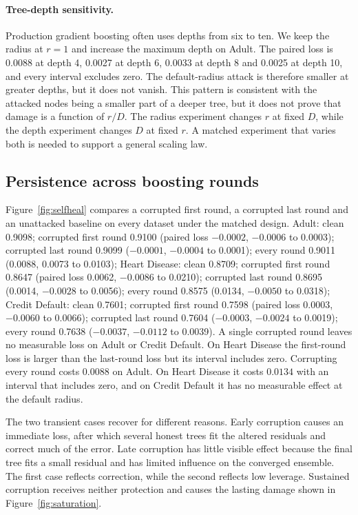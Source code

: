 \documentclass[11pt]{article}
\begin{document}
\paragraph{Tree-depth sensitivity.} Production gradient boosting often uses depths from six to ten. We keep the radius at $r=1$ and increase the maximum depth on Adult. The paired loss is 0.0088 at depth 4, 0.0027 at depth 6, 0.0033 at depth 8 and 0.0025 at depth 10, and every interval excludes zero. The default-radius attack is therefore smaller at greater depths, but it does not vanish. This pattern is consistent with the attacked nodes being a smaller part of a deeper tree, but it does not prove that damage is a function of $r/D$. The radius experiment changes $r$ at fixed $D$, while the depth experiment changes $D$ at fixed $r$. A matched experiment that varies both is needed to support a general scaling law.

\FloatBarrier

\subsection{Persistence across boosting rounds}
\label{sec:persistenceresults}

Figure~\ref{fig:selfheal} compares a corrupted first round, a corrupted last round and an unattacked baseline on every dataset under the matched design. Adult: clean 0.9098; corrupted first round 0.9100 (paired loss $-0.0002$, $-0.0006$ to 0.0003); corrupted last round 0.9099 ($-0.0001$, $-0.0004$ to 0.0001); every round 0.9011 (0.0088, 0.0073 to 0.0103); Heart Disease: clean 0.8709; corrupted first round 0.8647 (paired loss 0.0062, $-0.0086$ to 0.0210); corrupted last round 0.8695 (0.0014, $-0.0028$ to 0.0056); every round 0.8575 (0.0134, $-0.0050$ to 0.0318); Credit Default: clean 0.7601; corrupted first round 0.7598 (paired loss 0.0003, $-0.0060$ to 0.0066); corrupted last round 0.7604 ($-0.0003$, $-0.0024$ to 0.0019); every round 0.7638 ($-0.0037$, $-0.0112$ to 0.0039). A single corrupted round leaves no measurable loss on Adult or Credit Default. On Heart Disease the first-round loss is larger than the last-round loss but its interval includes zero. Corrupting every round costs $0.0088$ on Adult. On Heart Disease it costs $0.0134$ with an interval that includes zero, and on Credit Default it has no measurable effect at the default radius.

The two transient cases recover for different reasons. Early corruption causes an immediate loss, after which several honest trees fit the altered residuals and correct much of the error. Late corruption has little visible effect because the final tree fits a small residual and has limited influence on the converged ensemble. The first case reflects correction, while the second reflects low leverage. Sustained corruption receives neither protection and causes the lasting damage shown in Figure~\ref{fig:saturation}.
\end{document}
